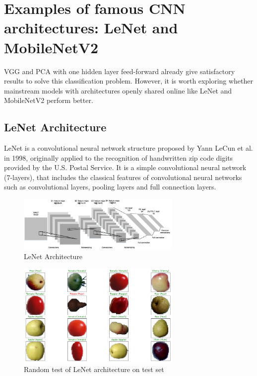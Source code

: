 \documentclass[10pt,english, openany]{book}
\begin{document}
\chapter{Examples of famous CNN architectures: LeNet and MobileNetV2}\label{chapt:modelCNN2}

VGG and PCA with one hidden layer feed-forward already give satisfactory results to solve this classification problem. However, it is worth exploring whether mainstream models with architectures openly shared online like LeNet and MobileNetV2 perform better.

\section{LeNet Architecture}

LeNet is a convolutional neural network structure proposed by Yann LeCun et al. in 1998, originally  applied to the recognition of handwritten zip code digits provided by the U.S. Postal Service. 
It is a simple convolutional neural network (7-layers), that includes the classical features of convolutional neural networks such as convolutional layers, pooling layers and full connection layers.

\begin{figure}[H]
    \centering
    \includegraphics[width=0.7\textwidth]{Images/3.0. LeNet.png}
    \caption{LeNet Architecture}
\end{figure}

\begin{figure}[H]
    \centering
    \includegraphics[width=0.7\textwidth
]{Images/3.1. LeNet random images prediction.png}
    \caption{Random test of LeNet architecture on test set}
\end{figure}
\end{document}
